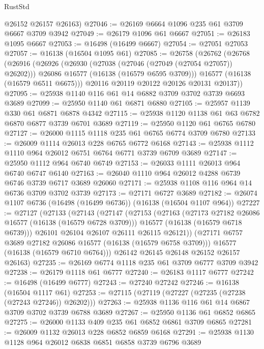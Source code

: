 \begin{lexlean}{RustStd}
\begin{coremodule}
      @26152
      @26157
      @26163)
@27046 := @26169 @6664 @1096 @235 @61 @3709 @6667 @3709 @3942
@27049 := @26179 @1096 @61 @6667
@27051 := @26183 @1095 @6667
@27053 := @16498 (@16499 @6667)
@27054 := @27051 @27053
@27057 := @16138 (@16504 @1095 @61)
@27085 := @26758
    (@26762
      (@26768
        (@26916
          (@26926
            (@26930 (@27038 (@27046 (@27049 (@27054 @27057)) @26202)))
            @26086
            @16577
            (@16138 (@16579 @6595 @3709)))
          @16577
          (@16138 (@16579 @6511 @6675)))
        @20116
        @20119
        @20122
        @20126
        @20131
        @20137))
@27095 := @25938 @1140 @116 @61 @14 @6882 @3709 @3702 @3739 @6693 @3689
@27099 := @25950 @1140 @61 @6871 @6880
@27105 := @25957 @1139 @330 @61 @6871 @6878 @4342
@27115 := @25938 @1120 @1138 @61 @63 @6782 @6870 @6877 @3739 @6701 @3689
@27119 := @25950 @1120 @61 @6765 @6780
@27127 := @26000 @1115 @1118 @235 @61 @6765 @6774 @3709 @6780
@27133 := @26009 @1114 @26013 @228 @6765 @6772 @6168
@27143 := @25938 @1112 @1110 @964 @26012 @6751 @6764 @6771 @3739 @6709 @3689
@27147 := @25950 @1112 @964 @6740 @6749
@27153 := @26033 @1111 @26013 @964 @6740 @6747 @6140
@27163 := @26040 @1110 @964 @26012 @4288 @6739 @6746 @3739 @6717 @3689 @26060
@27171 := @25938 @1108 @116 @964 @14 @6736 @3709 @3702 @3739
@27173 := @27171 @6727 @3689
@27182 := @26074 @1107 @6736 (@16498 (@16499 @6736)) (@16138 (@16504 @1107 @964))
@27227 := @27127
    (@27133
      (@27143
        (@27147
          (@27153
            (@27163
              (@27173 @27182 @26086 @16577 (@16138 (@16579 @6728 @3709)))
              @16577
              (@16138 (@16579 @6718 @6739)))
            @26101
            @26104
            @26107
            @26111
            @26115
            @26121))
        (@27171 @6757 @3689 @27182 @26086 @16577 (@16138 (@16579 @6758 @3709)))
        @16577
        (@16138 (@16579 @6710 @6764)))
      @26142
      @26145
      @26148
      @26152
      @26157
      @26163)
@27235 := @26169 @6774 @1118 @235 @61 @3709 @6777 @3709 @3942
@27238 := @26179 @1118 @61 @6777
@27240 := @26183 @1117 @6777
@27242 := @16498 (@16499 @6777)
@27243 := @27240 @27242
@27246 := @16138 (@16504 @1117 @61)
@27253 := @27115 (@27119 (@27227 (@27235 (@27238 (@27243 @27246)) @26202)))
@27263 := @25938 @1136 @116 @61 @14 @6867 @3709 @3702 @3739 @6788 @3689
@27267 := @25950 @1136 @61 @6852 @6865
@27275 := @26000 @1133 @409 @235 @61 @6852 @6861 @3709 @6865
@27281 := @26009 @1132 @26013 @228 @6852 @6859 @6168
@27291 := @25938 @1130 @1128 @964 @26012 @6838 @6851 @6858 @3739 @6796 @3689

\end{coremodule}
\end{lexlean}
